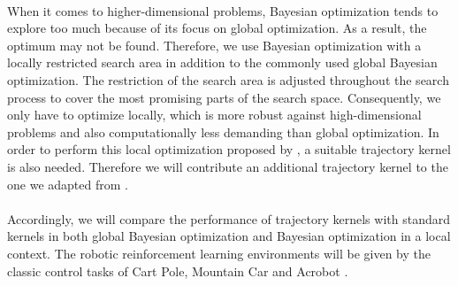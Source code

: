 \\
When it comes to higher-dimensional problems, Bayesian optimization tends to explore too much because of its focus on global optimization. As a result, the optimum may not be found. Therefore, we use Bayesian optimization with a locally restricted search area \cite{akrour2017local} in addition to the commonly used global Bayesian optimization. The restriction of the search area is adjusted throughout the search process to cover the most promising parts of the search space. Consequently, we only have to optimize locally, which is more robust against high-dimensional problems and also computationally less demanding than global optimization. In order to perform this local optimization proposed by \cite{akrour2017local}, a suitable trajectory kernel is also needed. Therefore we will contribute an additional trajectory kernel to the one we adapted from \cite{wilson2014using}.\\
\\
Accordingly, we will compare the performance of trajectory kernels with standard kernels in both global Bayesian optimization and Bayesian optimization in a local context. The robotic reinforcement learning environments will be given by the classic control tasks of Cart Pole, Mountain Car and Acrobot \cite{sutton1998reinforcement}.\\
